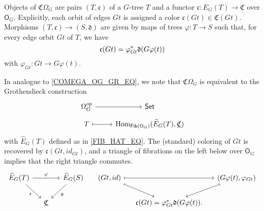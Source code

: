 \documentclass[a4paper,10pt
]{article}%
\renewcommand{\phi}{\varphi}
\newcommand{\UC}{\underline{\mathfrak C}}
\renewcommand{\1}{\ensuremath{\mathbb{id}}}
\renewcommand{\hat}{\widehat}
\begin{document}
Objects of $\UC \Omega_G$ are pairs $(T, \mathfrak c)$ of
a $G$-tree $T$ and
a functor $\mathfrak c: E_G(T) \to \underline{\mathfrak C}$ over $\mathsf O_G$.
Explicitly, each orbit of edges $G t$ %
is assigned a color $\mathfrak c(G t) \in \underline{\mathfrak C}(G t)$. %
Morphisms $(T, \mathfrak c) \to (S, \mathfrak d)$ 
are given by maps of trees $\phi: T \to S$ such that, for every edge orbit $G t$ of $T$, we have
\begin{equation}
      \mathfrak c(G t) = \phi_{G t}^{\**} \mathfrak d(G \phi(t))
\end{equation}
with $\phi_{G t}: G t \to G \phi(t)$.

\begin{remark}
      In analogue to \eqref{COMEGA_OG_GR_EQ}, we note that $\UC \Omega_G$ is equivalent to the Grothendieck construction
      \begin{equation}
            \label{COMEGAG_OG_GR_EQ}
            \begin{tikzcd}[row sep = tiny]
                  \Omega_G^{op} \arrow[r]
                  &
                  \mathsf{Set}
                  \\
                  T \arrow[r, mapsto]
                  &
                  \Hom_{\mathsf{Fib} (\mathsf O_G)}(\hat E_G(T), \UC)
            \end{tikzcd}
      \end{equation}
      with $\hat E_G(T)$ defined as in \eqref{FIB_HAT_EQ}.
      The (standard) coloring of $G t$ is recovered by $\mathfrak c(G t, id_{G t})$, and
      a triangle of fibrations on the left below over $\mathsf O_G$
      implies that the right triangle commutes.
      \begin{equation}
            \begin{tikzcd}[column sep = small]
                  \hat E_G(T) \arrow[rr, "\phi"] \arrow[dr, "\mathfrak c"']
                  &&
                  \hat E_G(S) \arrow[dl, "\mathfrak d"]
                  &
                  (G t, id) \arrow[rr, mapsto] \arrow[dr, mapsto]
                  &&
                  (G \phi(t), \phi_{G t}) \arrow[dl, mapsto]
                  \\
                  &
                  \UC
                  &
                  &
                  &
                  \mathfrak c(G t) = \phi_{G t}^{\**} \mathfrak d(G \phi(t)).
            \end{tikzcd}
      \end{equation}
\end{remark}
\end{document}
